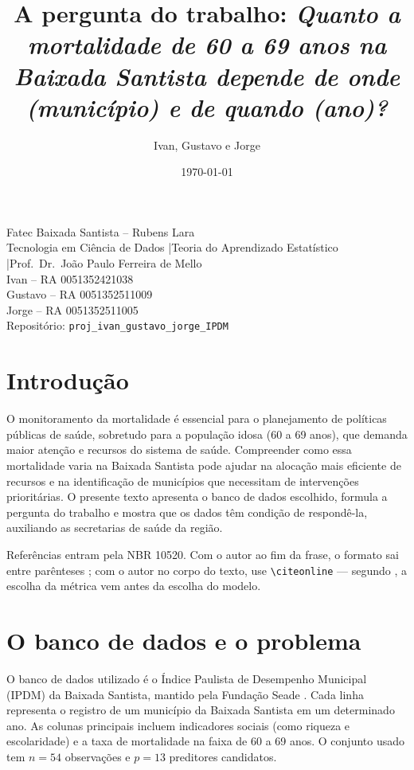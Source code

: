 \documentclass[12pt,a4paper,oneside]{article}\usepackage[]{graphicx}\usepackage[]{xcolor}
\title{A pergunta do trabalho: \textit{Quanto a mortalidade de 60 a 69 anos
na Baixada Santista depende de onde (município) e de quando (ano)?}}
\author{Ivan, Gustavo e Jorge}
\date{\today}
\providecommand{\citeonline}[1]{\citet{#1}}
\providecommand{\textual}{}
\newcommand{\nomecurso}{Tecnologia em Ciência de Dados}
\newcommand{\nomedisciplina}{Teoria do Aprendizado Estatístico}
\newcommand{\nomeprofessor}{Prof.\ Dr.\ João Paulo Ferreira de Mello}
\newcommand{\repositorio}{proj\_ivan\_gustavo\_jorge\_IPDM}
\newcommand{\integrantes}{%
  Ivan -- RA 0051352421038 \\
  Gustavo -- RA 0051352511009 \\
  Jorge -- RA 0051352511005%
}
\begin{document}
\frenchspacing

\maketitle

\begin{center}
  \small
  Fatec Baixada Santista -- Rubens Lara \\
  \nomecurso{} \quad|\quad \nomedisciplina{} \quad|\quad \nomeprofessor{} \\[0.4em]
  \integrantes \\[0.4em]
  Repositório: \texttt{\repositorio}
\end{center}

\textual

\section{Introdução}
O monitoramento da mortalidade é essencial para o planejamento de políticas públicas de saúde, sobretudo para a população idosa (60 a 69 anos), que demanda maior atenção e recursos do sistema de saúde. Compreender como essa mortalidade varia na Baixada Santista pode ajudar na alocação mais eficiente de recursos e na identificação de municípios que necessitam de intervenções prioritárias. O presente texto apresenta o banco de dados escolhido, formula a pergunta do trabalho e mostra que os dados têm condição de respondê-la, auxiliando as secretarias de saúde da região.

Referências entram pela NBR 10520. Com o autor ao fim da frase, o formato sai
entre parênteses \cite{james2021}; com o autor no corpo do texto, use
\verb|\citeonline| --- segundo \citeonline{bruce2019}, a escolha da métrica vem
antes da escolha do modelo.

\section{O banco de dados e o problema}
O banco de dados utilizado é o Índice Paulista de Desempenho Municipal (IPDM) da Baixada Santista, mantido pela Fundação Seade \cite{fonte_dados}. Cada linha representa o registro de um município da Baixada Santista em um determinado ano. As colunas principais incluem indicadores sociais (como riqueza e escolaridade) e a taxa de mortalidade na faixa de 60 a 69 anos. O conjunto usado tem $n = \text{54}$ observações e $p = \text{13}$ preditores candidatos.
\end{document}
